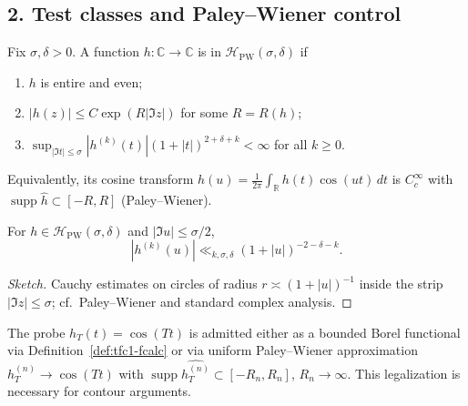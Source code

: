 \subsection*{2. Test classes and Paley--Wiener control}\relax\hspace{0pt}
\label{subsec:tfc1-pw} %

\begin{definition}\relax\hspace{0pt}
\label{def:tfc1-pw} %
Fix $\sigma,\delta>0$. A function $h:\mathbb{C}\to\mathbb{C}$ is in $\mathcal{H}_{\mathrm{PW}}(\sigma,\delta)$ if
\begin{enumerate}\relax\hspace{0pt}
\item $h$ is entire and even; %
\item $|h(z)|\le C\exp(R|\Im z|)$ for some $R=R(h)$; %
\item $\sup_{|\Im t|\le \sigma}|h^{(k)}(t)|(1+|t|)^{2+\delta+k}<\infty$ for all $k\ge0$. %
\end{enumerate}
Equivalently, its cosine transform $\widehat{h}(u)=\frac{1}{2\pi}\int_{\mathbb{R}}h(t)\cos(ut)\,dt$ is $C_c^\infty$ with $\operatorname{supp}\widehat{h}\subset[-R,R]$ (Paley--Wiener).\relax\hspace{0pt}
\end{definition}

\begin{lemma}\relax\hspace{0pt}
\label{lem:tfc1-deriv} %
For $h\in\mathcal{H}_{\mathrm{PW}}(\sigma,\delta)$ and $|\Im u|\le\sigma/2$,
\[
|h^{(k)}(u)|\ll_{k,\sigma,\delta} (1+|u|)^{-2-\delta-k}.
\]
\end{lemma}

\begin{proof}[Sketch]\relax\hspace{0pt}
Cauchy estimates on circles of radius $r\asymp (1+|u|)^{-1}$ inside the strip $|\Im z|\le\sigma$; cf.\ Paley--Wiener and standard complex analysis.\relax\hspace{0pt}
\end{proof}

\begin{remark}\relax\hspace{0pt}
\label{rem:tfc1-wave} %
The probe $h_T(t)=\cos(Tt)$ is admitted either as a bounded Borel functional via Definition~\ref{def:tfc1-fcalc} or via uniform Paley--Wiener approximation $h_T^{(n)}\to \cos(Tt)$ with $\operatorname{supp}\widehat{h_T^{(n)}}\subset[-R_n,R_n]$, $R_n\to\infty$. This legalization is necessary for contour arguments.\relax\hspace{0pt}
\end{remark}

